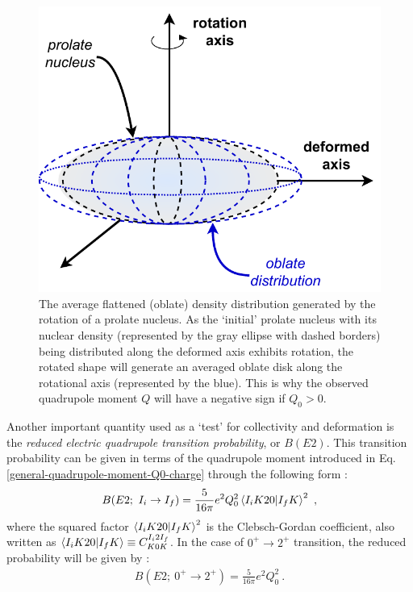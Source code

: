 \begin{figure}
    \centering
    \includegraphics[scale=0.7]{Chapters/Figures/averaged_nuclearMatter_prolate.pdf}
    \caption{The average flattened (oblate) density distribution generated by the rotation of a prolate nucleus. As the `initial' prolate nucleus with its nuclear density (represented by the gray ellipse with dashed borders) being distributed along the deformed axis exhibits rotation, the rotated shape will generate an averaged oblate disk along the rotational axis (represented by the blue). This is why the observed quadrupole moment $Q$ will have a negative sign if $Q_0>0$.}
    \label{fig-averaged-prolate-density}
\end{figure}

Another important quantity used as a `test' for collectivity and deformation is the \emph{reduced electric quadrupole transition probability}, or $B(E2)$. This transition probability can be given in terms of the quadrupole moment introduced in Eq. \eqref{general-quadrupole-moment-Q0-charge} through the following form \cite{bohr1998nuclear}:
\begin{align}
    B(E2;\ I_i\to I_f)=\frac{5}{16\pi}e^2Q_0^2\bra{I_iK20}\ket{I_fK}^2\ ,
    \label{reduced-E2-clebsch-gordan}
\end{align}
where the squared factor $\bra{I_iK20}\ket{I_fK}^2$ is the Clebsch-Gordan coefficient, also written as $\bra{I_iK20}\ket{I_fK}\equiv C^{I_i2I_f}_{K0K}$. In the case of $0^+\to 2^+$ transition, the reduced probability will be given by \cite{casten2000nuclear}:
\begin{align}
    B(E2;\ 0^+\to 2^+)=\frac{5}{16\pi}e^2Q_0^2\ .
    \label{reduced-E2-0Plus-2Plus-Transition}
\end{align}

